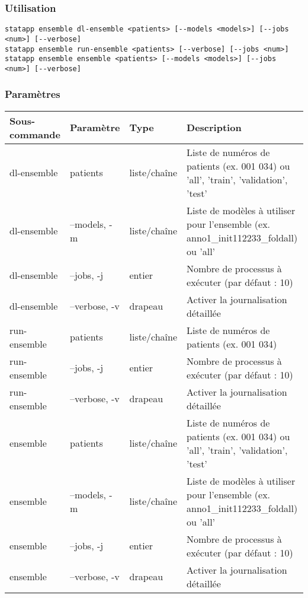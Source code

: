 \documentclass{article}
\begin{document}
\subsubsection{Utilisation}
\begin{lstlisting}
statapp ensemble dl-ensemble <patients> [--models <models>] [--jobs <num>] [--verbose]
statapp ensemble run-ensemble <patients> [--verbose] [--jobs <num>]
statapp ensemble ensemble <patients> [--models <models>] [--jobs <num>] [--verbose]
\end{lstlisting}

\subsubsection{Paramètres}
\begin{tabulary}{\linewidth}{LLLL}
\toprule
\textbf{Sous-commande} & \textbf{Paramètre} & \textbf{Type} & \textbf{Description} \\
\midrule
dl-ensemble & patients & liste/chaîne & Liste de numéros de patients (ex. 001 034) ou 'all', 'train', 'validation', 'test' \\
dl-ensemble & --models, -m & liste/chaîne & Liste de modèles à utiliser pour l'ensemble (ex. anno1\_init112233\_foldall) ou 'all' \\
dl-ensemble & --jobs, -j & entier & Nombre de processus à exécuter (par défaut : 10) \\
dl-ensemble & --verbose, -v & drapeau & Activer la journalisation détaillée \\
\midrule
run-ensemble & patients & liste/chaîne & Liste de numéros de patients (ex. 001 034) \\
run-ensemble & --jobs, -j & entier & Nombre de processus à exécuter (par défaut : 10) \\
run-ensemble & --verbose, -v & drapeau & Activer la journalisation détaillée \\
\midrule
ensemble & patients & liste/chaîne & Liste de numéros de patients (ex. 001 034) ou 'all', 'train', 'validation', 'test' \\
ensemble & --models, -m & liste/chaîne & Liste de modèles à utiliser pour l'ensemble (ex. anno1\_init112233\_foldall) ou 'all' \\
ensemble & --jobs, -j & entier & Nombre de processus à exécuter (par défaut : 10) \\
ensemble & --verbose, -v & drapeau & Activer la journalisation détaillée \\
\bottomrule
\end{tabulary}
\end{document}
